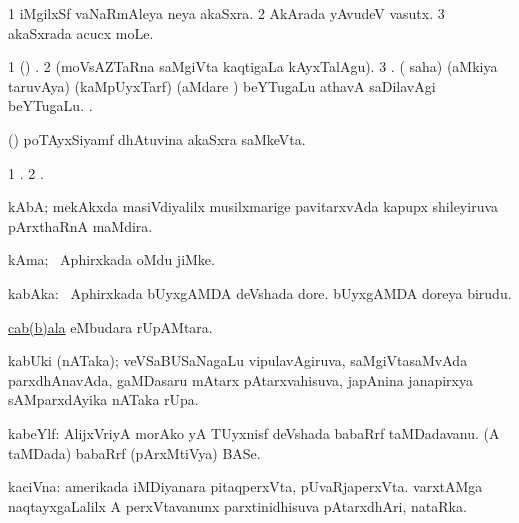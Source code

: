 \bentry
{}
\gl{\nA}
\bmng
\bnum
\num{1} iMgilxSf vaNaRmAleya neya akaSxra. 
\num{2}  AkArada yAvudeV vasutx. 
\num{3}  akaSxrada acucx moLe. 
\enum
\emng
\eentry

\bentry
{}
\gl{\saMkiSx}
\bmng
\bnum
\num{1} (\beY) . 
\num{2}  (moVsAZTaRna saMgiVta kaqtigaLa kAyxTalAgu). 
\num{3} . 
 ( saha) (aMkiya taruvAya) 
\banum
{} (kaMpUyxTarf)  (aMdare ) beYTugaLu athavA saDilavAgi  beYTugaLu. 
 . 
\eanum
\numie
\enum
\emng
\eentry

\bentry
{}
\gl{\saMkeV}
\bmng
(\ravi) poTAyxSiyamf dhAtuvina akaSxra saMkeVta. 
\emng
\eentry

\bentry
{}
\gl{\saMkiSx}
\bmng
\bnum
\num{1} . 
\num{2} . 
\enum
\emng
\eentry

\bentry
{}
\gl{\nA}
\bmng
kAbA; mekAkxda masiVdiyalilx musilxmarige pavitarxvAda kapupx shileyiruva pArxthaRnA maMdira. 
\emng
\eentry

\bentry
{}
\gl{\nA}
\bmng
kAma; \da\ Aphirxkada oMdu jiMke. 
\emng
\eentry

\bentry
{}
\gl{\nA}
\bmng
kabAka: 
\banum
{} \da\ Aphirxkada bUyxgAMDA deVshada dore. 
 bUyxgAMDA doreya birudu. 
\eanum
\emng
\eentry

\bentry
{}
\gl{\nA}
\bmng
\hyperref{kandict_c.pdf}{C}{cab(b)ala}{cab(b)ala} eMbudara rUpAMtara. 
\emng
\eentry

\bentry
{}
\gl{\nA}
\bmng
kabUki (nATaka); veVSaBUSaNagaLu vipulavAgiruva, saMgiVtasaMvAda parxdhAnavAda, gaMDasaru mAtarx pAtarxvahisuva, japAnina janapirxya sAMparxdAyika nATaka rUpa. 
\emng
\eentry

\bentry
{}
\gl{\nA}
\bmng
kabeYlf: 
\banum
{} AlijxVriyA morAko yA TUyxnisf deVshada babaRrf taMDadavanu. 
 (A taMDada) babaRrf (pArxMtiVya) BASe. 
\eanum
\emng
\eentry

\bentry
{}
\gl{\nA}
\bmng
kaciVna: 
\banum
{} amerikada iMDiyanara pitaqperxVta, pUvaRjaperxVta. 
\hypertarget{kachina(b)}{} 
 varxtAMga naqtayxgaLalilx A perxVtavanunx parxtinidhisuva pAtarxdhAri, nataRka. 
\eanum
\emng
\eentry

